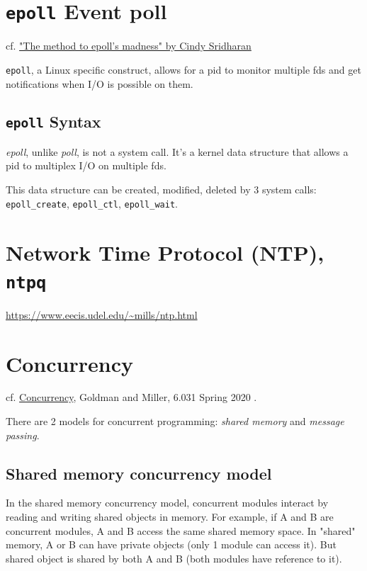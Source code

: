 \documentclass[10pt]{amsart}
\begin{document}
\begin{multicols*}{2}
\section{\texttt{epoll} Event poll}

cf. \href{https://medium.com/@copyconstruct/the-method-to-epolls-madness-d9d2d6378642}{"The method to epoll's madness" by Cindy Sridharan}\cite{Srid2017}

\texttt{epoll}, a Linux specific construct, allows for a pid to monitor multiple fds and get notifications when I/O is possible on them. 


\subsection{\texttt{epoll} Syntax}

\emph{epoll}, unlike \emph{poll}, is not a system call. It's a kernel data structure that allows a pid to multiplex I/O on multiple fds.

This data structure can be created, modified, deleted by 3 system calls: \texttt{epoll\_create}, \texttt{epoll\_ctl}, \texttt{epoll\_wait}.


\section{Network Time Protocol (NTP), \texttt{ntpq}}

\url{https://www.eecis.udel.edu/~mills/ntp.html}

\section{Concurrency}

cf. \href{http://web.mit.edu/6.031/www/sp20/classes/20-concurrency/}{Concurrency}, Goldman and Miller, 6.031 Spring 2020 \cite{6dot005and6dot031}. 

There are 2 models for concurrent programming: \emph{shared memory} and \emph{message passing}. 

\subsection{Shared memory concurrency model}

In the shared memory concurrency model, concurrent modules interact by reading and writing shared objects in memory. For example, if A and B are concurrent modules, A and B access the same shared memory space. In "shared" memory, A or B can have private objects (only 1 module can access it). But shared object is shared by both A and B (both modules have reference to it).


\end{multicols*}
\end{document}
